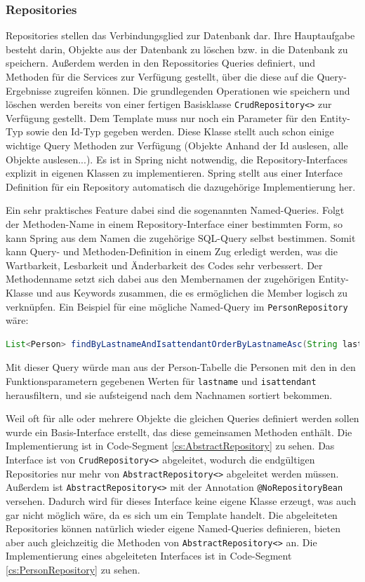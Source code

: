 \subsubsection{Repositories}
\normalsize
Repositories stellen das Verbindungsglied zur Datenbank dar. Ihre Hauptaufgabe besteht darin, Objekte aus der Datenbank zu löschen bzw. in die Datenbank zu speichern. Außerdem werden in den Repossitories Queries definiert, und Methoden für die Services zur Verfügung gestellt, über die diese auf die Query-Ergebnisse zugreifen können. Die grundlegenden Operationen wie speichern und löschen werden bereits von einer fertigen Basisklasse \verb|CrudRepository<>| zur Verfügung gestellt. Dem Template muss nur noch ein Parameter für den Entity-Typ sowie den Id-Typ gegeben werden. Diese Klasse stellt auch schon einige wichtige Query Methoden zur Verfügung (Objekte Anhand der Id auslesen, alle Objekte auslesen...). Es ist in Spring nicht notwendig, die Repository-Interfaces explizit in eigenen Klassen zu implementieren. Spring stellt aus einer Interface Definition für ein Repository automatisch die dazugehörige Implementierung her. 

Ein sehr praktisches Feature dabei sind die sogenannten Named-Queries. Folgt der Methoden-Name in einem Repository-Interface einer bestimmten Form, so kann Spring aus dem Namen die zugehörige SQL-Query selbst bestimmen. Somit kann Query- und Methoden-Definition in einem Zug erledigt werden, was die Wartbarkeit, Lesbarkeit und Änderbarkeit des Codes sehr verbessert. Der Methodenname setzt sich dabei aus den Membernamen der zugehörigen Entity-Klasse und aus Keywords zusammen, die es ermöglichen die Member logisch zu verknüpfen. Ein Beispiel für eine mögliche Named-Query im \verb|PersonRepository| wäre:

\scriptsize
\begin{lstlisting}[language=Java]
	List<Person> findByLastnameAndIsattendantOrderByLastnameAsc(String lastname, Boolean isattendant);
\end{lstlisting}
\normalsize
Mit dieser Query würde man aus der Person-Tabelle die Personen mit den in den Funktionsparametern gegebenen Werten für  \verb|lastname| und  \verb|isattendant| herausfiltern, und sie aufsteigend nach dem Nachnamen sortiert bekommen.

Weil oft für alle oder mehrere Objekte die gleichen Queries definiert werden sollen wurde ein Basis-Interface erstellt, das diese gemeinsamen Methoden enthält. Die Implementierung ist in Code-Segment \ref{cs:AbstractRepository} zu sehen. Das Interface ist von \verb|CrudRepository<>| abgeleitet, wodurch die endgültigen Repositories nur mehr von \verb|AbstractRepository<>| abgeleitet werden müssen. Außerdem ist \verb|AbstractRepository<>| mit der Annotation \verb|@NoRepositoryBean| versehen. Dadurch wird für dieses Interface keine eigene Klasse erzeugt, was auch gar nicht möglich wäre, da es sich um ein Template handelt. Die abgeleiteten Repositories können natürlich wieder eigene Named-Queries definieren, bieten aber auch gleichzeitig die Methoden von \verb|AbstractRepository<>| an. Die Implementierung eines abgeleiteten Interfaces ist in Code-Segment \ref{cs:PersonRepository} zu sehen.

